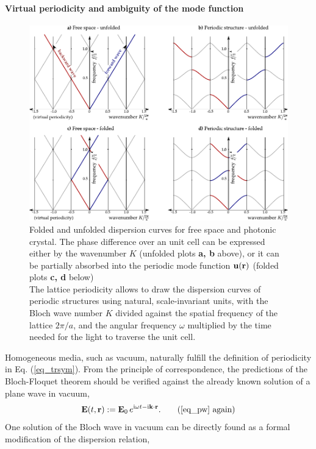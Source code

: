 \paragraph{Virtual periodicity and ambiguity of the mode function}%
\begin{figure}[ht] \caption{Folded and unfolded dispersion curves for free space and photonic crystal. The phase difference over an unit cell can be expressed either by the wavenumber $K$ (unfolded plots \textbf{a, b} above), or it can be partially absorbed into the periodic mode function $\mathbf{u}({\mathbf{r}})$ (folded plots \textbf{c, d} below)\\
The lattice periodicity allows to draw the dispersion curves of periodic structures using natural, scale-invariant units, with the Bloch wave number $K$ divided against the spatial frequency of the lattice $2\pi/a$, and the angular frequency $\omega$ multiplied by the time needed for the light to traverse the unit cell.
} \label{fg_phcfolding} \centering  %
	\includegraphics[width=\textwidth]{img/PhC_folding_illustration.pdf} 
\end{figure}
Homogeneous media, such as vacuum, naturally fulfill the definition of periodicity in Eq. (\ref{eq_trsym}).
From the principle of correspondence, the predictions of the Bloch-Floquet theorem should be verified against the already known solution of a plane wave in vacuum, 
\begin{equation} \E(t, \rr) := \E_0\, e^{\ii\omega t - \ii\kk\cdot\rr}. \tag{\ref{eq_pw} \again} \end{equation}
One solution of the Bloch wave in vacuum can be directly found as a formal modification of the dispersion relation,
